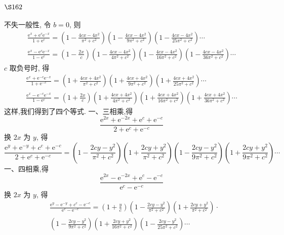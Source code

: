 \section{$\S 162$}

不失一般性, 令 $b=0$, 则
\[
\begin{gathered}
\frac{\mathrm{e}^{x}+\mathrm{e}^{c} \mathrm{e}^{-x}}{1+\mathrm{e}^{c}}=\left(1-\frac{4 c x-4 x^{2}}{\pi^{2}+c^{2}}\right)\left(1-\frac{4 c x-4 x^{2}}{9 \pi^{2}+c^{2}}\right)\left(1-\frac{4 c x-4 x^{2}}{25 \pi^{2}+c^{2}}\right) \cdots \\
\frac{\mathrm{e}^{x}-\mathrm{e}^{c} \mathrm{e}^{-x}}{1-\mathrm{e}^{c}}=\left(1-\frac{2 x}{c}\right)\left(1-\frac{4 c x-4 x^{2}}{4 \pi^{2}+c^{2}}\right)\left(1-\frac{4 c x-4 x^{2}}{16 \pi^{2}+c^{2}}\right)\left(1-\frac{4 c x-4 x^{2}}{36 \pi^{2}+c^{2}}\right) \cdots
\end{gathered}
\]
$c$ 取负号时, 得
\[
\begin{gathered}
\frac{\mathrm{e}^{x}+\mathrm{e}^{-c} \mathrm{e}^{-x}}{1+\mathrm{e}^{-c}}=\left(1+\frac{4 c x+4 x^{2}}{\pi^{2}+c^{2}}\right)\left(1+\frac{4 c x+4 x^{2}}{9 \pi^{2}+c^{2}}\right)\left(1+\frac{4 c x+4 x^{2}}{25 \pi^{2}+c^{2}}\right) \cdots \\
\frac{\mathrm{e}^{x}-\mathrm{e}^{-c} \mathrm{e}^{-x}}{1-\mathrm{e}^{c}}=\left(1+\frac{2 x}{c}\right)\left(1+\frac{4 c x+4 x^{2}}{4 \pi^{2}+c^{2}}\right)\left(1+\frac{4 c x+4 x^{2}}{16 \pi^{2}+c^{2}}\right)\left(1+\frac{4 c x+4 x^{2}}{36 \pi^{2}+c^{2}}\right) \cdots
\end{gathered}
\]
这样,我们得到了四个等式. 一、三相乘,得
\[
\frac{\mathrm{e}^{2 x}+\mathrm{e}^{-2 x}+\mathrm{e}^{c}+\mathrm{e}^{-c}}{2+\mathrm{e}^{c}+\mathrm{e}^{-c}}
\]
换 $2 x$ 为 $y$, 得
\[
\frac{\mathrm{e}^{y}+\mathrm{e}^{-y}+c^{c}+\mathrm{e}^{-c}}{2+\mathrm{e}^{c}+\mathrm{e}^{-c}}=\left(1-\frac{2 c y-y^{2}}{\pi^{2}+c^{2}}\right)\left(1+\frac{2 c y+y^{2}}{\pi^{2}+c^{2}}\right)\left(1-\frac{2 c y-y^{2}}{9 \pi^{2}+c^{2}}\right)\left(1+\frac{2 c y+y^{2}}{9 \pi^{2}+c^{2}}\right) \cdots
\]
一、四相乘,得
\[
\frac{\mathrm{e}^{2 x}-\mathrm{e}^{-2 x}+\mathrm{e}^{c}-\mathrm{e}^{-c}}{\mathrm{e}^{c}-\mathrm{e}^{-c}}
\]
换 $2 x$ 为 $y$, 得
\[
\begin{aligned}
& \frac{\mathrm{e}^{y}-\mathrm{e}^{-y}+c^{c}-\mathrm{e}^{-c}}{\mathrm{e}^{c}-\mathrm{e}^{-c}}=\left(1+\frac{y}{c}\right)\left(1-\frac{2 c y-y^{2}}{\pi^{2}+c^{2}}\right)\left(1+\frac{2 c y+y^{2}}{\pi^{2}+c^{2}}\right) \cdot \\
&\left(1-\frac{2 c y-y^{2}}{9 \pi^{2}+c^{2}}\right)\left(1+\frac{2 c y+y^{2}}{16 \pi^{2}+c^{2}}\right)\left(1-\frac{2 c y-y^{2}}{25 \pi^{2}+c^{2}}\right) \cdots
\end{aligned}
\]
